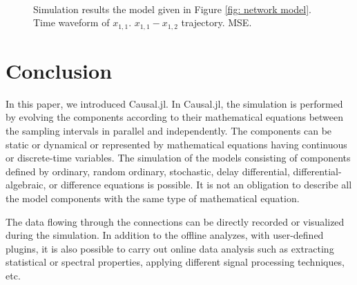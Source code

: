 \documentclass{juliacon}
\begin{document}
\begin{figure}
{    } \\[-0.1cm]
    \caption{Simulation results the model given in Figure \ref{fig: network model}. \protect{} Time waveform of $x_{1,1}$. \protect{} $x_{1,1} - x_{1,2}$ trajectory. \protect{} MSE.}
    \label{fig: network simulation results}
\end{figure}

\section{Conclusion}
In this paper, we introduced Causal.jl. In Causal.jl, the simulation is performed by evolving the components according to their mathematical equations between the sampling intervals in parallel and independently. The components can be static or dynamical or represented by mathematical equations having continuous or discrete-time variables. The simulation of the models consisting of components defined by ordinary, random ordinary, stochastic, delay differential, differential-algebraic, or difference equations is possible. It is not an obligation to describe all the model components with the same type of mathematical equation.

The data flowing through the connections can be directly recorded or visualized during the simulation. In addition to the offline analyzes, with user-defined plugins, it is also possible to carry out online data analysis such as extracting statistical or spectral properties, applying different signal processing techniques, etc. 
\end{document}
